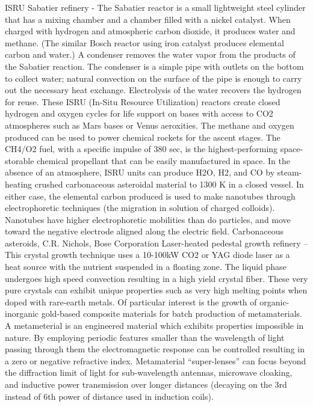 \documentclass[a4paper]{book}
\begin{document}
ISRU Sabatier refinery - The Sabatier reactor is a small lightweight steel cylinder that has a mixing chamber and a chamber filled with a nickel catalyst. When charged with hydrogen and atmospheric carbon dioxide, it produces water and methane.  (The similar Bosch reactor using iron catalyst produces elemental carbon and water.) A condenser removes the water vapor from the products of the Sabatier reaction.  The condenser is a simple pipe with outlets on the bottom to collect water; natural convection on the surface of the pipe is enough to carry out the necessary heat exchange. Electrolysis of the water recovers the hydrogen for reuse. These ISRU (In-Situ Resource Utilization) reactors create closed hydrogen and oxygen cycles for life support on bases with access to CO2 atmospheres such as Mars bases or Venus aeroxities. The methane and oxygen produced can be used to power chemical rockets for the ascent stages. The CH4/O2 fuel, with a specific impulse of 380 sec, is the highest-performing space-storable chemical propellant that can be easily manufactured in space. In the absence of an atmosphere, ISRU units can produce H2O, H2, and CO by steam-heating crushed carbonaceous asteroidal material to 1300 K in a closed vessel. In either case, the elemental carbon produced is used to make nanotubes through electrophoretic techniques (the migration in solution of charged colloids).  Nanotubes have higher electrophoretic mobilities than do particles, and move toward the negative electrode aligned along the electric field.   Carbonaceous asteroids, C.R. Nichols, Bose Corporation
Laser-heated pedestal growth refinery – This crystal growth technique uses a 10-100kW CO2 or YAG diode laser as a heat source with the nutrient suspended in a floating zone.  The liquid phase undergoes high speed convection resulting in a high yield crystal fiber.  These very pure crystals can exhibit unique properties such as very high melting points when doped with rare-earth metals. Of particular interest is the growth of organic-inorganic gold-based composite materials for batch production of metamaterials. A metameterial is an engineered material which exhibits properties impossible in nature.  By employing periodic features smaller than the wavelength of light passing through them the electromagnetic response can be controlled resulting in a zero or negative refractive index.  Metamaterial “super-lenses” can focus beyond the diffraction limit of light for sub-wavelength antennas, microwave cloaking, and inductive power transmission over longer distances (decaying on the 3rd instead of 6th power of distance used in induction coils).
 
\end{document}
